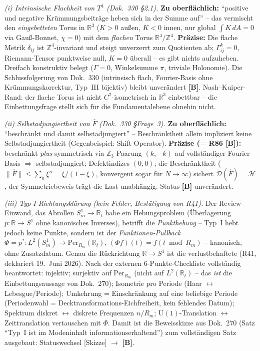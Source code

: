 \emph{(i) Intrinsische Flachheit von $T^4$ (Dok.~330 §2.1).}
\textbf{Zu oberflächlich:} \enquote{positive und negative Krümmungsbeiträge
heben sich in der Summe auf} -- das vermischt den \emph{eingebetteten}
Torus in $\mathbb{R}^3$ ($K>0$ außen, $K<0$ innen, nur global
$\int K\,dA = 0$ via Gauß-Bonnet, $\chi=0$) mit dem \emph{flachen}
Torus $\mathbb{R}^4/\mathbb{Z}^4$.
\textbf{Präzise:} Die flache Metrik $\delta_{ij}$ ist
$\mathbb{Z}^4$-invariant und steigt unverzerrt zum Quotienten ab;
$\Gamma^k_{ij}=0$, Riemann-Tensor punktweise null, $K=0$ überall --
es gibt nichts aufzuheben. Dreifach konstruktiv belegt
($\Gamma=0$, Winkelsumme $\pi$, triviale Holonomie).
Die Schlussfolgerung von Dok.~330 (intrinsisch flach, Fourier-Basis
ohne Krümmungskorrektur, Typ~III bijektiv) bleibt unverändert
\textbf{[B]}. Nash--Kuiper-Rand: der flache Torus ist nicht $C^2$-isometrisch
in $\mathbb{R}^3$ einbettbar -- die Einbettungsfrage stellt sich für
die Fundamentalebene ohnehin nicht.

\emph{(ii) Selbstadjungiertheit von $\hat F$ (Dok.~330 §Frage~3).}
\textbf{Zu oberflächlich:} \enquote{beschränkt und damit selbstadjungiert}
-- Beschränktheit allein impliziert keine Selbstadjungiertheit
(Gegenbeispiel: Shift-Operator).
\textbf{Präzise (= R86 \textbf{[B]}):} beschränkt \emph{plus} symmetrisch
via $\mathbb{Z}_3$-Paarung $(k,-k)$ auf vollständiger Fourier-Basis
$\Rightarrow$ selbstadjungiert; Defektindizes $(0,0)$; die Beschränktheit
($\|\hat F\| \le \sum_n \xi^n = \xi/(1-\xi)$, konvergent sogar für
$N\to\infty$) sichert $\mathcal{D}(\hat F)=\mathcal{H}$, der
Symmetriebeweis trägt die Last unabhängig. Status \textbf{[B]} unverändert.

\emph{(iii) Typ-I-Richtungsklärung (kein Fehler, Bestätigung von R41).}
Der Review-Einwand, das Abrollen $S^1_m \to \mathbb{R}_t$ habe ein
Hebungsproblem (Überlagerung $p:\mathbb{R}\to S^1$ ohne kanonisches
Inverses), betrifft die \emph{Punkthebung} -- Typ~I hebt jedoch keine
Punkte, sondern ist der \emph{Funktionen-Pullback}
$\Phi = p^*: L^2(S^1_m) \to \mathrm{Per}_{R_m}(\mathbb{R}_t)$,
$(\Phi f)(t) = f(t \bmod R_m)$ -- kanonisch, ohne Zusatzdatum.
Genau die Rückrichtung $\mathbb{R}\to S^1$ ist die verlustbehaftete
(R41, deklariert 19.~Juni 2026). Nach der externen 6-Punkte-Checkliste
vollständig beantwortet: injektiv; surjektiv auf
$\mathrm{Per}_{R_m}$ (nicht auf $L^2(\mathbb{R}_t)$ -- das \emph{ist}
die Einbettungsaussage von Dok.~270); Isometrie pro Periode
(Haar $\leftrightarrow$ Lebesgue/Periode); Umkehrung = Einschränkung
auf eine beliebige Periode (Periodenwahl = Decktransformations-Eichfreiheit,
kein fehlendes Datum); Spektrum diskret $\leftrightarrow$ diskrete
Frequenzen $n/R_m$; $\mathrm{U}(1)$-Translation $\leftrightarrow$
Zeittranslation vertauschen mit $\Phi$.
Damit ist die Beweisskizze aus Dok.~270 (Satz \enquote{Typ~I ist im
Modeninhalt informationserhaltend}) zum vollständigen Satz ausgebaut:
Statuswechsel [Skizze] $\to$ \textbf{[B]}.

